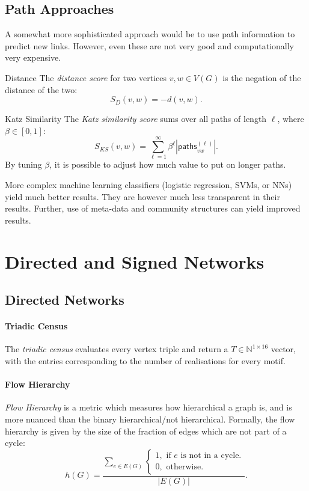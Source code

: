 \documentclass[english]{panikzettel}
\newcommand{\N}{\mathbb{N}}
\begin{document}
\subsection{Path Approaches}

A somewhat more sophisticated approach would be to use path information to predict new links. However, even these are not very good and computationally very expensive.

\begin{defi}{Distance}
    The \textit{distance score} for two vertices $v,w \in V(G)$ is the negation of the distance of the two:
    \[
        S_D(v,w) = -d(v,w).
    \]
\end{defi}

\begin{defi}{Katz Similarity}
    The \textit{Katz similarity score} sums over all paths of length $\ell$, where $\beta \in [0,1]$:
    \[
        S_{KS}(v,w) = \sum_{\ell=1}^{\infty} \beta^\ell \left|\textsf{paths}_{vw}^{(\ell)}\right|.
    \]
    By tuning $\beta$, it is possible to adjust how much value to put on longer paths.
\end{defi}

More complex machine learning classifiers (logistic regression, SVMs, or NNs) yield much better results.
They are however much less transparent in their results.
Further, use of meta-data and community structures can yield improved results.

\section{Directed and Signed Networks}

\subsection{Directed Networks}

\paragraph{Triadic Census}
The \textit{triadic census} evaluates every vertex triple and return a $T \in \N^{1\times16}$ vector, with the entries corresponding to the number of realisations for every motif.



\paragraph{Flow Hierarchy}
\textit{Flow Hierarchy} is a metric which measures how hierarchical a graph is, and is more nuanced than the binary hierarchical/not hierarchical.
Formally, the flow hierarchy is given by the size of the fraction of edges which are not part of a cycle:
\[
    h(G) = \frac{\sum_{e \in E(G)} \begin{cases}1, \text{ if } e \text{ is not in a cycle.}\\0, \text{ otherwise.} \end{cases}}{|E(G)|}.
\]
\end{document}
